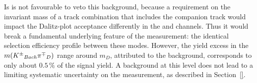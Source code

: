 Is is not favourable to veto this background, because a requirement on the invariant mass of a track combination that includes the companion track would impact the Dalitz-plot acceptance differently in the {\DK} and {\Dpi} channels. Thus it would break a fundamental underlying feature of the measurement: the identical selection efficiency profile between these modes. However, the yield excess in the $m({{K}^\pm}_{Bach}{{\pi}^\mp}_D)$ range around $m_D$, attributed to the background, corresponds to only about $0.5\,\%$ of the signal yield. A background at this level does not lead to a limiting systematic uncertainty on the measurement, as described in Section~\ref{}.



